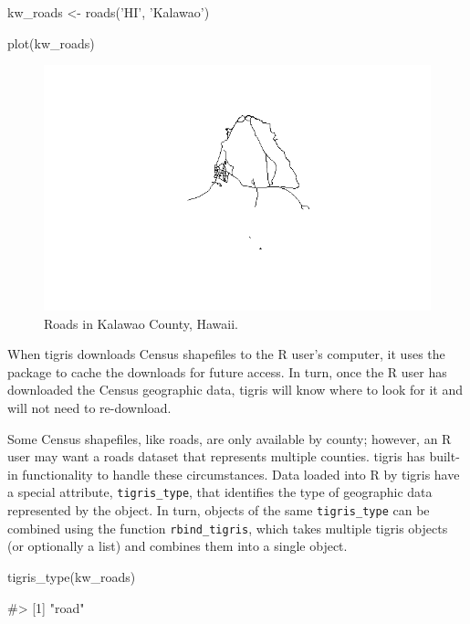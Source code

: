 \begin{Schunk}
\begin{Sinput}
kw_roads <- roads('HI', 'Kalawao')

plot(kw_roads)
\end{Sinput}
\end{Schunk}

\begin{figure}[htbp]
  \centering
  \includegraphics[width=\textwidth]{kalawao}
  \caption{Roads in Kalawao County, Hawaii.}
  \label{figure:kalawao}
\end{figure}

When tigris downloads Census shapefiles to the R user's computer, it
uses the  package to cache the downloads for future
access. In turn, once the R user has downloaded the Census geographic
data, tigris will know where to look for it and will not need to
re-download.

Some Census shapefiles, like roads, are only available by county;
however, an R user may want a roads dataset that represents multiple
counties. tigris has built-in functionality to handle these
circumstances. Data loaded into R by tigris have a special attribute,
\texttt{tigris\_type}, that identifies the type of geographic data
represented by the object. In turn, objects of the same
\texttt{tigris\_type} can be combined using the function
\texttt{rbind\_tigris}, which takes multiple tigris objects (or
optionally a list) and combines them into a single object.

\begin{Schunk}
\begin{Sinput}
tigris_type(kw_roads)
\end{Sinput}
\begin{Soutput}
#> [1] "road"
\end{Soutput}
\end{Schunk}

